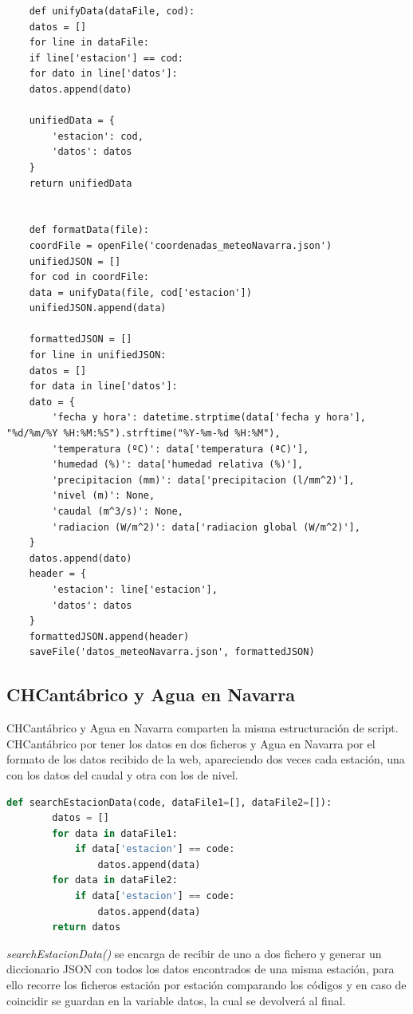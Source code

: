 \begin{lstlisting}
	def unifyData(dataFile, cod):
	datos = []
	for line in dataFile:
	if line['estacion'] == cod:
	for dato in line['datos']:
	datos.append(dato)
	
	unifiedData = {
		'estacion': cod,
		'datos': datos
	}
	return unifiedData
	
	
	def formatData(file):
	coordFile = openFile('coordenadas_meteoNavarra.json')
	unifiedJSON = []
	for cod in coordFile:
	data = unifyData(file, cod['estacion'])
	unifiedJSON.append(data)
	
	formattedJSON = []
	for line in unifiedJSON:
	datos = []
	for data in line['datos']:
	dato = {
		'fecha y hora': datetime.strptime(data['fecha y hora'], "%d/%m/%Y %H:%M:%S").strftime("%Y-%m-%d %H:%M"),
		'temperatura (ºC)': data['temperatura (ªC)'],
		'humedad (%)': data['humedad relativa (%)'],
		'precipitacion (mm)': data['precipitacion (l/mm^2)'],
		'nivel (m)': None,
		'caudal (m^3/s)': None,
		'radiacion (W/m^2)': data['radiacion global (W/m^2)'],
	}
	datos.append(dato)
	header = {
		'estacion': line['estacion'],
		'datos': datos
	}
	formattedJSON.append(header)
	saveFile('datos_meteoNavarra.json', formattedJSON)
\end{lstlisting}

\subsection{CHCantábrico y Agua en Navarra}

CHCantábrico y Agua en Navarra comparten la misma estructuración de script. CHCantábrico por tener los datos en dos ficheros y Agua en Navarra por el formato de los datos recibido de la web, apareciendo dos veces cada estación, una con los datos del caudal y otra con los de nivel.

\begin{lstlisting}[language=Python, caption={Declaración función \textit{searchEstacionData()}}]
	def searchEstacionData(code, dataFile1=[], dataFile2=[]):
		datos = []
		for data in dataFile1:
			if data['estacion'] == code:
				datos.append(data)
		for data in dataFile2:
			if data['estacion'] == code:
				datos.append(data)
		return datos
\end{lstlisting}

\textit{searchEstacionData()} se encarga de recibir de uno a dos fichero y generar un diccionario JSON con todos los datos encontrados de una misma estación, para ello recorre los ficheros estación por estación comparando los códigos y en caso de coincidir se guardan en la variable datos, la cual se devolverá al final.

